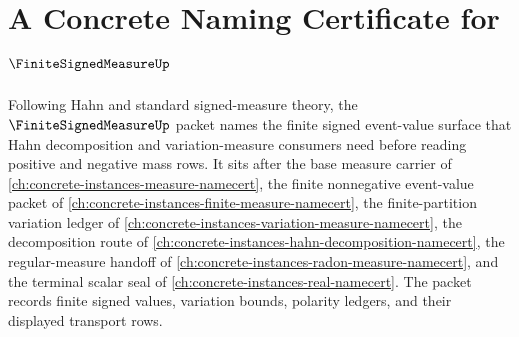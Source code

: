 \chapter{A Concrete Naming Certificate for $\FiniteSignedMeasureUp$}
\label{ch:concrete-instances-finite-signed-measure-namecert}

Following Hahn and standard signed-measure theory, the $\FiniteSignedMeasureUp$ packet names the finite signed event-value surface that Hahn decomposition and variation-measure consumers need before reading positive and negative mass rows. It sits after the base measure carrier of \autoref{ch:concrete-instances-measure-namecert}, the finite nonnegative event-value packet of \autoref{ch:concrete-instances-finite-measure-namecert}, the finite-partition variation ledger of \autoref{ch:concrete-instances-variation-measure-namecert}, the decomposition route of \autoref{ch:concrete-instances-hahn-decomposition-namecert}, the regular-measure handoff of \autoref{ch:concrete-instances-radon-measure-namecert}, and the terminal scalar seal of \autoref{ch:concrete-instances-real-namecert}. The packet records finite signed values, variation bounds, polarity ledgers, and their displayed transport rows.

